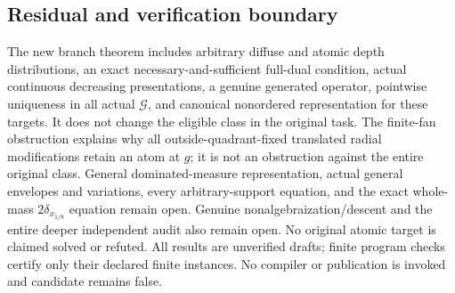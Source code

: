 \subsection{Residual and verification boundary}
The new branch theorem includes arbitrary diffuse and atomic depth
distributions, an exact necessary-and-sufficient full-dual condition,
actual continuous decreasing presentations, a genuine generated operator,
pointwise uniqueness in all actual $\mathcal G$, and canonical nonordered
representation for these targets. It does not change the eligible class
in the original task. The finite-fan obstruction explains why all
outside-quadrant-fixed translated radial modifications retain an atom at
$g$; it is not an obstruction against the entire original class.
General dominated-measure representation, actual general envelopes and
variations, every arbitrary-support equation, and the exact whole-mass
$2\delta_{x_{1/8}}$ equation remain open. Genuine nonalgebraization/descent
and the entire deeper independent audit also remain open. No original
atomic target is claimed solved or refuted. All results are unverified
drafts; finite program checks certify only their declared finite instances.
No compiler or publication is invoked and candidate remains false.

